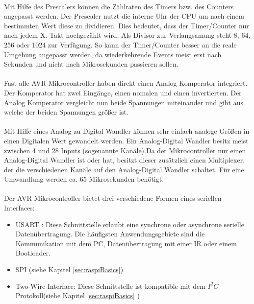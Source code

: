 \paragraph{}
Mit Hilfe des Prescalers können die Zählraten des Timers bzw. des Counters angepasst werden. Der Prescaler nutzt die interne Uhr der CPU um nach einem bestimmten Wert diese zu dividieren. Dies bedeutet, dass der Timer/Counter nur nach jedem X. Takt hochgezählt wird. Als Divisor zur Verlangsamung steht 8, 64, 256 oder 1024 zur Verfügung. So kann der Timer/Counter besser an die reale Umgebung angepasst werden, da wiederkehrende Events meist erst nach Sekunden  und nicht nach Mikrosekunden passieren sollen. 
\paragraph{}
Fast alle AVR-Mikrocontroller haben direkt einen Analog Komperator integriert. Der Komperator hat zwei Eingänge, einen nomalen und einen invertierten. Der Analog Komperator vergleicht nun beide Spannungen miteinander und gibt aus welche der beiden Spannungen größer ist.
\paragraph{}
Mit Hilfe eines Analog zu Digital Wandler können sehr einfach analoge Größen in einen Digitalen Wert gewandelt werden. Ein Analog-Digital Wandler besitz meist zwischen 4 und 28 Inputs (sogenannte Kanäle).Da der Mikrocontroller nur einen Analog-Digital Wandler ist oder hat, besitzt dieser zusätzlich einen Multiplexer, der die verschiedenen Kanäle auf den Analog-Digital Wandler schaltet. Für eine Umwandlung werden ca. 65 Mikrosekunden benötigt.
\paragraph{}
Der AVR-Mikrocontroller bietet drei verschiedene Formen eines seriellen Interfaces: 
\begin{itemize}
\item \ac{USART} : Diese Schnittstelle erlaubt eine synchrone oder asynchrone serielle Datenübertragung. Die häufigsten Anwendungsgebiete sind die Kommunikation mit dem PC, Datenübertragung mit einer IR oder einem Bootloader.
\item \ac{SPI} (siehe Kapitel \ref{sec:raspiBasics})
\item Two-Wire Interface: Diese Schnittstelle ist kompatible  mit dem $I^{2}C$ Protokoll(siehe Kapitel \ref{sec:raspiBasics} )
\end{itemize}
